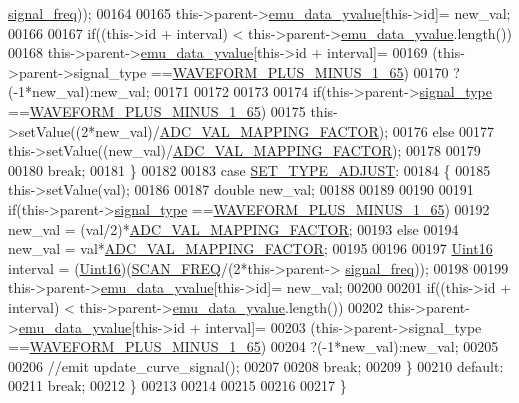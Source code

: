 \begin{DoxyCode}
      \hyperlink{a00008_a67039999d520fc483fab521fae5ddde4}{signal\_freq}));
00164 
00165         this->parent->\hyperlink{a00008_ad922d05d1e988d84f404c115fe909f72}{emu\_data\_yvalue}[this->id]= new\_val;
00166 
00167         \textcolor{keywordflow}{if}((this->\textcolor{keywordtype}{id} + interval) < this->parent->\hyperlink{a00008_ad922d05d1e988d84f404c115fe909f72}{emu\_data\_yvalue}.length())
00168         this->parent->\hyperlink{a00008_ad922d05d1e988d84f404c115fe909f72}{emu\_data\_yvalue}[this->id + interval]=
00169         (this->parent->signal\_type ==\hyperlink{a00090_a0923d3b365a36e1e8c401cec964aa36f}{WAVEFORM\_PLUS\_MINUS\_1\_65})
00170         ?(-1*new\_val):new\_val;
00171 
00172 
00173 
00174         \textcolor{keywordflow}{if}(this->parent->\hyperlink{a00008_a070edaec5aee6ba1f5a6866bc32c8ce4}{signal\_type} ==\hyperlink{a00090_a0923d3b365a36e1e8c401cec964aa36f}{WAVEFORM\_PLUS\_MINUS\_1\_65})
00175         this->setValue((2*new\_val)/\hyperlink{a00086_ada92d3eeeec0cbeee41e76a52d145792}{ADC\_VAL\_MAPPING\_FACTOR});
00176         \textcolor{keywordflow}{else}
00177         this->setValue((new\_val)/\hyperlink{a00086_ada92d3eeeec0cbeee41e76a52d145792}{ADC\_VAL\_MAPPING\_FACTOR});
00178 
00179 
00180     \textcolor{keywordflow}{break};
00181     \}
00182 
00183     \textcolor{keywordflow}{case} \hyperlink{a00090_a16b6b7b5ad68ec0dd62a3c9e97f88adb}{SET\_TYPE\_ADJUST}:
00184     \{
00185         this->setValue(val);
00186 
00187         \textcolor{keywordtype}{double} new\_val;
00188 
00189 
00190 
00191         \textcolor{keywordflow}{if}(this->parent->\hyperlink{a00008_a070edaec5aee6ba1f5a6866bc32c8ce4}{signal\_type} ==\hyperlink{a00090_a0923d3b365a36e1e8c401cec964aa36f}{WAVEFORM\_PLUS\_MINUS\_1\_65})
00192         new\_val = (val/2)*\hyperlink{a00086_ada92d3eeeec0cbeee41e76a52d145792}{ADC\_VAL\_MAPPING\_FACTOR};
00193         \textcolor{keywordflow}{else}
00194         new\_val = val*\hyperlink{a00086_ada92d3eeeec0cbeee41e76a52d145792}{ADC\_VAL\_MAPPING\_FACTOR};
00195 
00196 
00197         \hyperlink{a00004_aae7407b021d43f7193a81a58cfb3e297}{Uint16} interval = (\hyperlink{a00004_aae7407b021d43f7193a81a58cfb3e297}{Uint16})(\hyperlink{a00086_a8127170b687c1f67a968886c128e76e4}{SCAN\_FREQ}/(2*this->parent->
      \hyperlink{a00008_a67039999d520fc483fab521fae5ddde4}{signal\_freq}));
00198 
00199         this->parent->\hyperlink{a00008_ad922d05d1e988d84f404c115fe909f72}{emu\_data\_yvalue}[this->id]= new\_val;
00200 
00201         \textcolor{keywordflow}{if}((this->\textcolor{keywordtype}{id} + interval) < this->parent->\hyperlink{a00008_ad922d05d1e988d84f404c115fe909f72}{emu\_data\_yvalue}.length())
00202         this->parent->\hyperlink{a00008_ad922d05d1e988d84f404c115fe909f72}{emu\_data\_yvalue}[this->id + interval]=
00203         (this->parent->signal\_type ==\hyperlink{a00090_a0923d3b365a36e1e8c401cec964aa36f}{WAVEFORM\_PLUS\_MINUS\_1\_65})
00204         ?(-1*new\_val):new\_val;
00205 
00206         \textcolor{comment}{//emit update\_curve\_signal();}
00207 
00208     \textcolor{keywordflow}{break};
00209     \}
00210     \textcolor{keywordflow}{default}:
00211         \textcolor{keywordflow}{break};
00212     \}
00213 
00214 
00215 
00216 
00217 \}
\end{DoxyCode}


